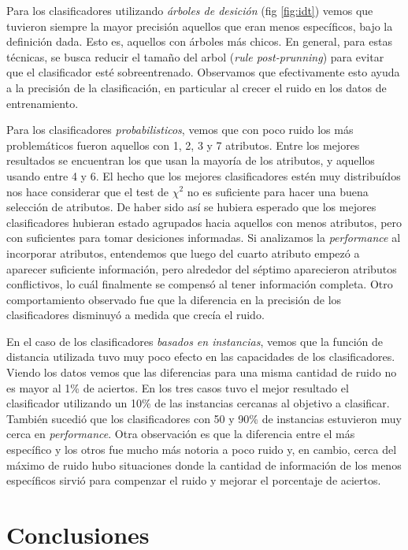 \documentclass[a4paper,10pt]{article}
\begin{document}

Para los clasificadores utilizando \emph{árboles de desición} (fig \ref{fig:idt}) vemos que tuvieron siempre la mayor precisión aquellos que eran menos específicos, bajo la definición dada. Esto es, aquellos con árboles más chicos. En general, para estas técnicas, se busca reducir el tamaño del arbol (\emph{rule post-prunning}) para evitar que el clasificador esté sobreentrenado. Observamos que efectivamente esto ayuda a la precisión de la clasificación, en particular al crecer el ruido en los datos de entrenamiento.

Para los clasificadores \emph{probabilisticos}, vemos que con poco ruido los más problemáticos fueron aquellos con 1, 2, 3 y 7 atributos. Entre los mejores resultados se encuentran los que usan la mayoría de los atributos, y aquellos usando entre 4 y 6. El hecho que los mejores clasificadores estén muy distribuídos nos hace considerar que el test de $\chi^2$ no es suficiente para hacer una buena selección de atributos. De haber sido así se hubiera esperado que los mejores clasificadores hubieran estado agrupados hacia aquellos con menos atributos, pero con suficientes para tomar desiciones informadas. Si analizamos la \emph{performance} al incorporar atributos, entendemos que luego del cuarto atributo empezó a aparecer suficiente información, pero alrededor del séptimo aparecieron atributos conflictivos, lo cuál finalmente se compensó al tener información completa. Otro comportamiento observado fue que la diferencia en la precisión de los clasificadores disminuyó a medida que crecía el ruido.

En el caso de los clasificadores \emph{basados en instancias}, vemos que la función de distancia utilizada tuvo muy poco efecto en las capacidades de los clasificadores. Viendo los datos vemos que las diferencias para una misma cantidad de ruido no es mayor al 1\% de aciertos. En los tres casos tuvo el mejor resultado el clasificador utilizando un 10\% de las instancias cercanas al objetivo a clasificar. También sucedió que los clasificadores con 50 y 90\% de instancias estuvieron muy cerca en \emph{performance}. Otra observación es que la diferencia entre el más específico y los otros fue mucho más notoria a poco ruido y, en cambio, cerca del máximo de ruido hubo situaciones donde la cantidad de información de los menos específicos sirvió para compenzar el ruido y mejorar el porcentaje de aciertos. 

\section{Conclusiones}
\end{document}
